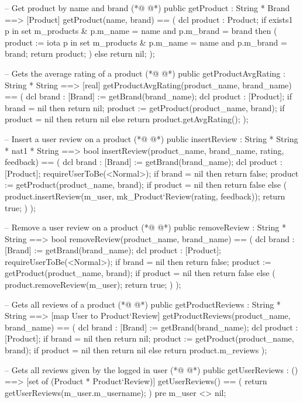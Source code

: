 \begin{vdmpp}[breaklines=true]
 -- Get product by name and brand
(*@
\label{getProduct:93}
@*)
 public getProduct : String * Brand ==> [Product]
 getProduct(name, brand) == 
 ( 
  dcl product : Product;
  if exists1 p in set m_products & p.m_name = name and p.m_brand = brand
  then (
   product := iota p in set m_products & p.m_name = name and p.m_brand = brand;
   return product;
  )
  else return nil;
 );
 
 -- Gets the average rating of a product
(*@
\label{getProductAvgRating:106}
@*)
 public getProductAvgRating : String * String ==> [real]
 getProductAvgRating(product_name, brand_name) == 
 ( 
  dcl brand : [Brand] := getBrand(brand_name);
  dcl product : [Product];
  if brand = nil then return nil;
  product := getProduct(product_name, brand);
  if product = nil then return nil
  else return product.getAvgRating();
 );
 
 -- Insert a user review on a product
(*@
\label{insertReview:118}
@*)
 public insertReview : String * String * nat1 * String ==> bool
 insertReview(product_name, brand_name, rating, feedback) == 
 ( 
  dcl brand : [Brand] := getBrand(brand_name);
  dcl product : [Product];
  requireUserToBe(<Normal>);
  if brand = nil then return false;
  product := getProduct(product_name, brand);
  if product = nil then return false
  else (
   product.insertReview(m_user, mk_Product`Review(rating, feedback));
   return true;
  )
 );
 
 -- Remove a user review on a product
(*@
\label{removeReview:134}
@*)
 public removeReview : String * String ==> bool
 removeReview(product_name, brand_name) == 
 ( 
  dcl brand : [Brand] := getBrand(brand_name);
  dcl product : [Product];
  requireUserToBe(<Normal>);
  if brand = nil then return false;
  product := getProduct(product_name, brand);
  if product = nil then return false
  else (
   product.removeReview(m_user);
   return true;
  )
 );
 
 -- Gets all reviews of a product
(*@
\label{getProductReviews:150}
@*)
 public getProductReviews : String * String ==> [map User to Product`Review]
 getProductReviews(product_name, brand_name) == 
 ( 
  dcl brand : [Brand] := getBrand(brand_name);
  dcl product : [Product];
  if brand = nil then return nil;
  product := getProduct(product_name, brand);
  if product = nil then return nil
  else return product.m_reviews
 );

 -- Gets all reviews given by the logged in user
(*@
\label{getUserReviews:162}
@*)
 public getUserReviews : () ==> [set of (Product * Product`Review)]
 getUserReviews() == 
 ( 
  return getUserReviews(m_user.m_username);
 )
 pre m_user <> nil;
 

\end{vdmpp}
